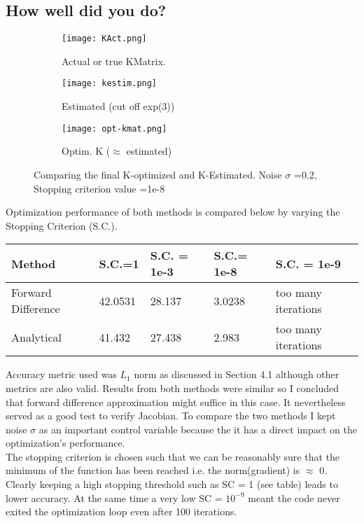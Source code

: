 \documentclass[titlepage]{article}
\begin{document}
\subsection{How well did you do?}
\begin{figure}[H]
\begin{subfigure}{0.3\textwidth}
\texttt{[image: KAct.png]}
\caption{Actual or true KMatrix.}
\end{subfigure}
\begin{subfigure}{0.3\textwidth}
\texttt{[image: kestim.png]}
\caption{Estimated (cut off exp(3))}
\end{subfigure}
\begin{subfigure}{0.3\textwidth}
\texttt{[image: opt-kmat.png]}
\caption{Optim. K ($\approx$ estimated)}
\end{subfigure}
\caption{Comparing the final K-optimized and K-Estimated. Noise $\sigma$ =0.2, Stopping criterion value =1e-8 }
\end{figure}
Optimization performance of both methods is compared below by varying the Stopping Criterion (S.C.).
\singlespacing
\begin{center}
\begin{tabular}{ | m{3cm} | m{2cm}| m{2cm} | m{2cm} | m{4cm} | } 
\hline
\textbf{Method} & \textbf{S.C.=1} & \textbf{S.C. = 1e-3} & \textbf{S.C.= 1e-8} & \textbf{S.C. = 1e-9} \\ 
\hline
Forward Difference & 42.0531 & 28.137 & 3.0238  & too many iterations \\ 
\hline
Analytical & 41.432 & 27.438 & 2.983 & too many iterations \\ 
\hline
\end{tabular}
\end{center}
\doublespacing
Accuracy metric used was $L_1$ norm as discussed in Section 4.1 although other metrics are also valid. Results from both methods were similar so I concluded that forward difference approximation might suffice in this case. It nevertheless served as a good test to verify Jacobian. To compare the two methods I kept noise $\sigma$ as an important control variable because the it has a direct impact on the optimization's performance.\\
The stopping criterion is chosen such that we can be reasonably sure that the minimum of the function has been reached i.e. the norm(gradient) is $\approx$ 0. Clearly keeping a high stopping threshold such as SC = 1 (see table) leads to lower accuracy. At the same time a very low SC = $10^{-9}$ meant the code never exited the optimization loop even after 100 iterations.
\end{document}
